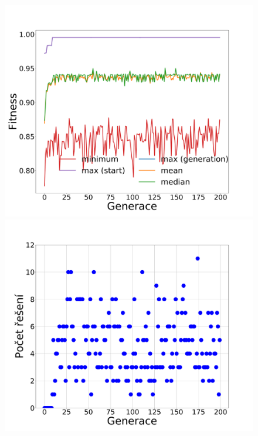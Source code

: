 \documentclass[11pt]{article}
\begin{document}
\begin{landscape}
\begin{figure}
\begin{minipage}[c]{0.35\textwidth}
        \centering \includegraphics[width=\textwidth]{img/m151g.pdf} 
    \end{minipage}
    \begin{minipage}[c]{0.35\textwidth}
        \centering \includegraphics[width=\textwidth]{img/m151s.pdf} 
    \end{minipage}
    \\
    \begin{minipage}[c]{0.35\textwidth}

\end{minipage}
\end{figure}
\end{landscape}
\end{document}

